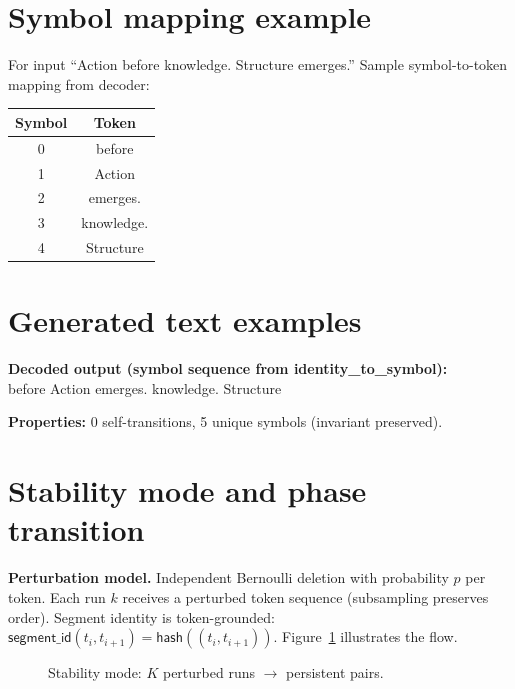 \section{Symbol mapping example}
\label{app:symbol_mapping}

For input ``Action before knowledge. Structure emerges.'' Sample symbol-to-token mapping from decoder:

\begin{center}
\begin{tabular}{cc}
\toprule
Symbol & Token \\
\midrule
0 & before \\
1 & Action \\
2 & emerges. \\
3 & knowledge. \\
4 & Structure \\
\bottomrule
\end{tabular}
\end{center}

\section{Generated text examples}
\label{app:generated}

\textbf{Decoded output (symbol sequence from identity\_to\_symbol):}\\
before Action emerges. knowledge. Structure

\textbf{Properties:} 0 self-transitions, 5 unique symbols (invariant preserved).

\section{Stability mode and phase transition}
\label{app:stability}

\textbf{Perturbation model.}
Independent Bernoulli deletion with probability $p$ per token. Each run $k$ receives a perturbed token sequence (subsampling preserves order). Segment identity is token-grounded: $\mathsf{segment\_id}(t_i, t_{i+1}) = \mathsf{hash}((t_i, t_{i+1}))$. Figure~\ref{fig:app:stability} illustrates the flow.

\begin{figure}[t]
\centering
{}
\caption{Stability mode: $K$ perturbed runs $\rightarrow$ persistent pairs.}
\label{fig:app:stability}
\end{figure}

